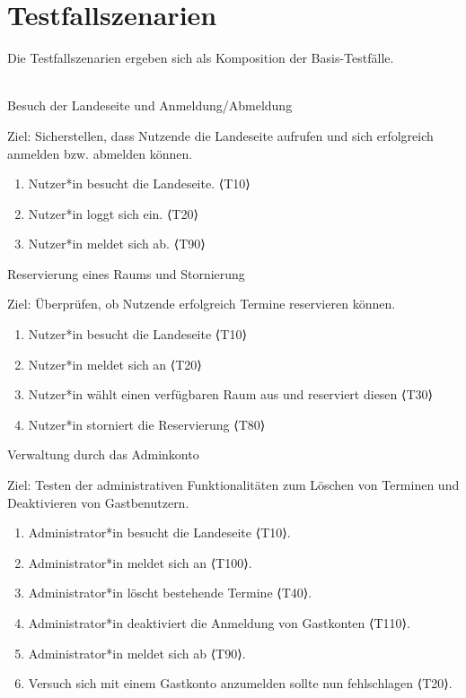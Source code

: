 \section{Testfallszenarien}
Die Testfallszenarien ergeben sich als Komposition der Basis-Testfälle.\\ \\
\begin{scenario}{10}{Besuch der Landeseite und Anmeldung/Abmeldung}
  \item[Ziel:] Sicherstellen, dass Nutzende die Landeseite aufrufen und sich erfolgreich anmelden bzw. abmelden können.
  \begin{enumerate}
    \item Nutzer*in besucht die Landeseite. ⟨T10⟩
    \item Nutzer*in loggt sich ein. ⟨T20⟩
    \item Nutzer*in meldet sich ab. ⟨T90⟩
  \end{enumerate}
\end{scenario}

\pagebreak

\begin{scenario}{20}{Reservierung eines Raums und Stornierung}
  \item[Ziel:] Überprüfen, ob Nutzende erfolgreich Termine reservieren können.
  \begin{enumerate}
    \item Nutzer*in besucht die Landeseite ⟨T10⟩
    \item Nutzer*in meldet sich an ⟨T20⟩
    \item Nutzer*in wählt einen verfügbaren Raum aus und reserviert diesen ⟨T30⟩
    \item Nutzer*in storniert die Reservierung ⟨T80⟩
  \end{enumerate}
\end{scenario}

\begin{scenario}{30}{Verwaltung durch das Adminkonto}
  \item[Ziel:] Testen der administrativen Funktionalitäten zum Löschen von Terminen und Deaktivieren von Gastbenutzern.
  \begin{enumerate}
    \item Administrator*in besucht die Landeseite ⟨T10⟩.
    \item Administrator*in meldet sich an ⟨T100⟩.
    \item Administrator*in löscht bestehende Termine ⟨T40⟩.
    \item Administrator*in deaktiviert die Anmeldung von Gastkonten ⟨T110⟩.
    \item Administrator*in meldet sich ab ⟨T90⟩.
    \item Versuch sich mit einem Gastkonto anzumelden sollte nun fehlschlagen ⟨T20⟩.
  \end{enumerate}
\end{scenario}

